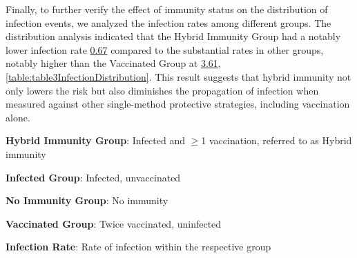 \documentclass[11pt]{article}
\begin{document}
Finally, to further verify the effect of immunity status on the distribution of infection events, we analyzed the infection rates among different groups. The distribution analysis indicated that the Hybrid Immunity Group had a notably lower infection rate \hyperlink{C0a}{0.67} compared to the substantial rates in other groups, notably higher than the Vaccinated Group at \hyperlink{C3a}{3.61}, \ref{table:table3InfectionDistribution}. This result suggests that hybrid immunity not only lowers the risk but also diminishes the propagation of infection when measured against other single-method protective strategies, including vaccination alone.

\begin{table}[h]
\caption{\protect\hyperlink{file-table-3-pkl}{Distribution of infection events by vaccination group}}
\label{table:table3InfectionDistribution}
\begin{threeparttable}
\renewcommand{\TPTminimum}{\linewidth}
\begin{tablenotes}
\footnotesize
\item \textbf{Hybrid Immunity Group}: Infected and $\geq$1 vaccination, referred to as Hybrid immunity
\item \textbf{Infected Group}: Infected, unvaccinated
\item \textbf{No Immunity Group}: No immunity
\item \textbf{Vaccinated Group}: Twice vaccinated, uninfected
\item \textbf{Infection Rate}: Rate of infection within the respective group
\end{tablenotes}
\end{threeparttable}
\end{table}
\end{document}
